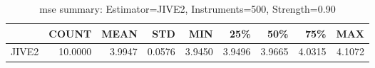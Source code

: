 \begin{table}[ht]
\centering
\caption{mse summary: Estimator=JIVE2, Instruments=500, Strength=0.90}
\begin{tabular}{lrrrrrrrr}
\toprule
 & COUNT & MEAN & STD & MIN & 25\% & 50\% & 75\% & MAX \\
\midrule
JIVE2 & 10.0000 & 3.9947 & 0.0576 & 3.9450 & 3.9496 & 3.9665 & 4.0315 & 4.1072 \\
\bottomrule
\end{tabular}
\end{table}
